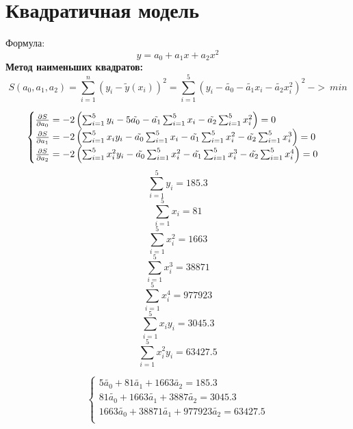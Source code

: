 \documentclass{article}
\begin{document}
\section*{Квадратичная модель}
Формула:
\[y = a_0 +a_1x+a_2x^2\]
\textbf{Метод наименьших квадратов:}
\[S(a_0, a_1, a_2) = \sum_{i=1}^{n}(y_i - \tilde{y}(x_i))^2 = \sum_{i=1}^{5}(y_i - \tilde{a_0} - \tilde{a_1}x_i - \tilde{a_2}x_i^2)^2 \ ->\ min\]


\[\begin{cases}
    \pdv{S}{a_0} = -2\left(\sum_{i=1}^{5}y_i - 5\tilde{a_0} - \tilde{a_1}\sum_{i=1}^{5}x_i - \tilde{a_2}\sum_{i=1}^{5}x_i^2\right) = 0\\
    \pdv{S}{a_1} = -2\left(\sum_{i=1}^{5}x_iy_i - \tilde{a_0}\sum_{i=1}^{5}x_i - \tilde{a_1}\sum_{i=1}^{5}x_i^2 - \tilde{a_2}\sum_{i=1}^{5}x_i^3\right) = 0\\
    \pdv{S}{a_2} = -2\left(\sum_{i=1}^{5}x_i^2y_i - \tilde{a_0}\sum_{i=1}^{5}x_i^2 - \tilde{a_1}\sum_{i=1}^{5}x_i^3 - \tilde{a_2}\sum_{i=1}^{5}x_i^4\right) = 0\\
\end{cases}\]
\[\sum_{i=1}^{5}y_i = 185.3\]
\[\sum_{i=1}^{5}x_i = 81\]
\[\sum_{i=1}^{5}x_i^2 = 1663\]
\[\sum_{i=1}^{5}x_i^3 = 38871\]
\[\sum_{i=1}^{5}x_i^4 = 977923\]
\[\sum_{i=1}^{5}x_iy_i = 3045.3\]
\[\sum_{i=1}^{5}x_i^2y_i = 63427.5\]

\[\begin{cases}
     5\tilde{a_0}+81\tilde{a_1}+1663\tilde{a_2} = 185.3\\
     81\tilde{a_0}+1663\tilde{a_1}+3887\tilde{a_2} = 3045.3\\
     1663\tilde{a_0}+38871\tilde{a_1}+977923\tilde{a_2} = 63427.5\\
\end{cases}\]
\end{document}
